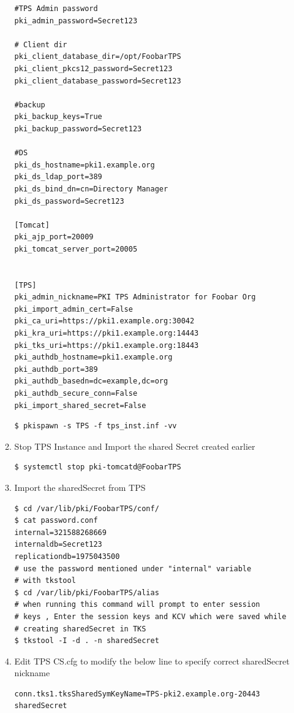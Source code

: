 \documentclass[a4paper]{article}
\begin{document}
\begin{enumerate}[label*=\arabic*.]
\begin{enumerate}[label*=\arabic*.]
\begin{lstlisting}[style=configFile]
#TPS Admin password
pki_admin_password=Secret123

# Client dir
pki_client_database_dir=/opt/FoobarTPS
pki_client_pkcs12_password=Secret123
pki_client_database_password=Secret123

#backup
pki_backup_keys=True
pki_backup_password=Secret123

#DS
pki_ds_hostname=pki1.example.org
pki_ds_ldap_port=389
pki_ds_bind_dn=cn=Directory Manager
pki_ds_password=Secret123

[Tomcat]
pki_ajp_port=20009
pki_tomcat_server_port=20005


[TPS]
pki_admin_nickname=PKI TPS Administrator for Foobar Org
pki_import_admin_cert=False
pki_ca_uri=https://pki1.example.org:30042
pki_kra_uri=https://pki1.example.org:14443
pki_tks_uri=https://pki1.example.org:18443
pki_authdb_hostname=pki1.example.org
pki_authdb_port=389
pki_authdb_basedn=dc=example,dc=org
pki_authdb_secure_conn=False
pki_import_shared_secret=False
            \end{lstlisting}            
            \begin{lstlisting}[style=bashInputStyle]
$ pkispawn -s TPS -f tps_inst.inf -vv
            \end{lstlisting}
        \item Stop TPS Instance and Import the shared Secret created earlier 
            \begin{lstlisting}[style=bashInputStyle]
$ systemctl stop pki-tomcatd@FoobarTPS            
            \end{lstlisting}
        \item Import the sharedSecret from TPS
            \begin{lstlisting}[style=bashInputStyle]
$ cd /var/lib/pki/FoobarTPS/conf/
$ cat password.conf
internal=321588268669
internaldb=Secret123
replicationdb=1975043500
# use the password mentioned under "internal" variable 
# with tkstool
$ cd /var/lib/pki/FoobarTPS/alias
# when running this command will prompt to enter session
# keys , Enter the session keys and KCV which were saved while 
# creating sharedSecret in TKS
$ tkstool -I -d . -n sharedSecret
            \end{lstlisting}
        \item Edit TPS CS.cfg to modify the below line to specify correct sharedSecret nickname
            \begin{lstlisting}
conn.tks1.tksSharedSymKeyName=TPS-pki2.example.org-20443 sharedSecret                
            \end{lstlisting}

\end{enumerate}
\end{enumerate}
\end{document}
